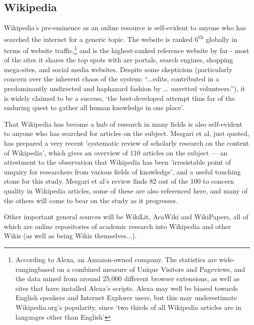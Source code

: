 \documentclass[a4paper,11pt,twoside,notitlepage]{article}
\newcommand{\super}[1]{\textsuperscript{#1}}
\begin{document}
        \subsection{Wikipedia}
        Wikipedia's pre-eminence as an online resource is self-evident
        to anyone who has searched the internet for a generic
        topic. The website is ranked 6\super{th} globally in terms of
        website traffic,\footnote{According to Alexa, an Amazon-owned
          company. The statistics are wide-rangingbased on a combined
          measure of Unique Visitors and Pageviews, and the data mined
          from around 25,000 different browser extensions, as well as
          sites that have installed Alexa's
          scripts.\cite{Alexa-about2014} Alexa may well be biased
          towards English speakers and Internet Explorer users, but
          this may underestimate Wikipedia.org's popularity, since
          `two thirds of all Wikipedia articles are in languages other
          than English'\cite{wikimedia-noteonalexa}} and is the
        highest-ranked reference website by far - most of the sites it
        shares the top spots with are portals, search engines,
        shopping mega-sites, and social media
        websites.\cite{Alexa-topsites2014} Despite some skepticism
        (particularly concern over the inherent chaos of the system:
        ``...edits, contributed in a predominantly undirected and
        haphazard fashion by ... unvetted
        volunteers.''\cite{Wilkinson2007}), it is widely
        claimed to be a success, `the best-developed attempt thus
        far of the enduring quest to gather all human knowledge in one
        place'\cite{Mesgari2014}.

        That Wikipedia has become a hub of research in many fields is
        also self-evident to anyone who has searched for articles on
        the subject. Mesgari et al, just quoted, has prepared a very
        recent 'systematic review of scholarly research on the content
        of Wikipedia', which gives an overview of 110 articles on the
        subject --- an attestment to the observation that Wikipedia
        has been 'irresistable point of unquiry for researchers from
        various fields of knowledge', and a useful touching stone for
        this study. Mesgari et al's review finds 82 out of the 100 to
        concern quality in Wikipedia articles, some of these are also
        referenced here, and many of the others will come to bear on
        the study as it progresses.

        Other important general sources will be WikiLit,\cite{wikilit}
        AcaWiki\cite{acawiki} and WikiPapers\cite{wikipapers}, all of
        which are online repositories of academic research into
        Wikipedia and other Wikis (as well as being Wikis
        themselves...).
\end{document}
